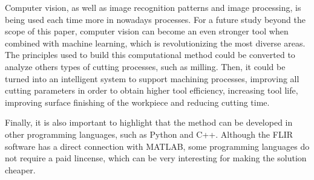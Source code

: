 Computer vision, as well as image recognition patterns and image processing, is being used each time more in nowadays processes. For a future study beyond the scope of this paper, computer vision can become an even stronger tool when combined with machine learning, which is revolutionizing the most diverse areas. The principles used to build this computational method could be converted to analyze others types of cutting processes, such as milling. Then, it could be turned into an intelligent system to support machining processes, improving all cutting parameters in order to obtain higher tool efficiency, increasing tool life, improving surface finishing of the workpiece and reducing cutting time. 

Finally, it is also important to highlight that the method can be developed in other programming languages, such as Python and C++. Although the FLIR software has a direct connection with MATLAB, some programming languages do not require a paid lincense, which can be very interesting for making the solution cheaper.
